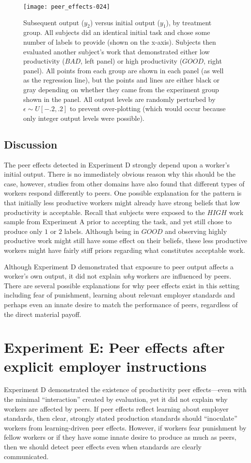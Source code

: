 \documentclass[12pt]{article}
\begin{document}
\begin{figure} 
\centering 
\texttt{[image: peer\_effects-024]}
\caption{Subsequent output ($y_2$) versus initial output ($y_1$), by
  treatment group. All subjects did an identical initial task and
  chose some number of labels to provide (shown on the
  x-axis). Subjects then evaluated another subject's work that
  demonstrated either low productivity ($BAD$, left panel) or high
  productivity ($GOOD$, right panel). All points from each group are
  shown in each panel (as well as the regression line), but the points
  and lines are either black or gray depending on whether they came
  from the experiment group shown in the panel. All output levels are
  randomly perturbed by $\epsilon \sim U[-.2,.2]$ to prevent
  over-plotting (which would occur because only integer output levels
  were possible).
   \label{fig:ExpD.output}}
\end{figure} 



\subsection{Discussion}
The peer effects detected in Experiment D strongly depend upon a
worker's initial output. There is no immediately obvious reason why
this should be the case, however, studies from other domains have also
found that different types of workers respond differently to
peers. One possible explanation for the pattern is that initially less
productive workers might already have strong beliefs that low
productivity is acceptable. Recall that subjects were exposed to the
$HIGH$ work sample from Experiment A prior to accepting the task, and
yet still chose to produce only $1$ or $2$ labels. Although being in
$GOOD$ and observing highly productive work might still have some
effect on their beliefs, these less productive workers might have
fairly stiff priors regarding what constitutes acceptable work.

Although Experiment D demonstrated that exposure to peer output
affects a worker's own output, it did not explain \emph{why} workers
are influenced by peers.  There are several possible explanations for
why peer effects exist in this setting including fear of punishment,
learning about relevant employer standards and perhaps even an innate
desire to match the performance of peers, regardless of the direct
material payoff.

\section{Experiment E: Peer effects after explicit employer instructions} 
Experiment D demonstrated the existence of productivity peer
effects---even with the minimal ``interaction'' created by evaluation,
yet it did not explain why workers are affected by peers. If peer
effects reflect learning about employer standards, then clear,
strongly stated production standards should ``inoculate'' workers
from learning-driven peer effects. However, if workers fear punishment
by fellow workers or if they have some innate desire to produce as
much as peers, then we should detect peer effects even when standards
are clearly communicated.
\end{document}
